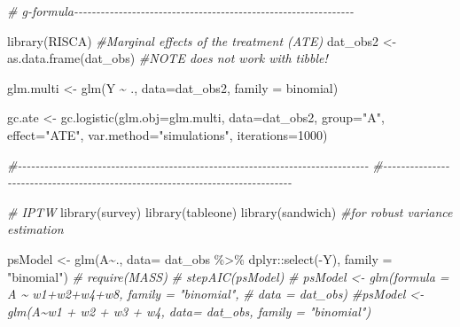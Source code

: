 \documentclass[
]{article}
\newenvironment{Shaded}{\begin{snugshade}}{\end{snugshade}}
\newcommand{\AttributeTok}[1]{\textcolor[rgb]{0.77,0.63,0.00}{#1}}
\newcommand{\CommentTok}[1]{\textcolor[rgb]{0.56,0.35,0.01}{\textit{#1}}}
\newcommand{\DecValTok}[1]{\textcolor[rgb]{0.00,0.00,0.81}{#1}}
\newcommand{\FunctionTok}[1]{\textcolor[rgb]{0.00,0.00,0.00}{#1}}
\newcommand{\NormalTok}[1]{#1}
\newcommand{\OtherTok}[1]{\textcolor[rgb]{0.56,0.35,0.01}{#1}}
\newcommand{\SpecialCharTok}[1]{\textcolor[rgb]{0.00,0.00,0.00}{#1}}
\newcommand{\StringTok}[1]{\textcolor[rgb]{0.31,0.60,0.02}{#1}}
\begin{document}
\begin{Shaded}
\begin{Highlighting}[]
\CommentTok{\# g{-}formula{-}{-}{-}{-}{-}{-}{-}{-}{-}{-}{-}{-}{-}{-}{-}{-}{-}{-}{-}{-}{-}{-}{-}{-}{-}{-}{-}{-}{-}{-}{-}{-}{-}{-}{-}{-}{-}{-}{-}{-}{-}{-}{-}{-}{-}{-}{-}{-}{-}{-}{-}{-}{-}{-}{-}{-}{-}{-}{-}{-}{-}{-}{-}}


\FunctionTok{library}\NormalTok{(RISCA)}
\CommentTok{\#Marginal effects of the treatment (ATE)}
\NormalTok{dat\_obs2 }\OtherTok{\textless{}{-}} \FunctionTok{as.data.frame}\NormalTok{(dat\_obs) }\CommentTok{\#NOTE does not work with tibble!}

\NormalTok{glm.multi }\OtherTok{\textless{}{-}} \FunctionTok{glm}\NormalTok{(Y }\SpecialCharTok{\textasciitilde{}}\NormalTok{ ., }\AttributeTok{data=}\NormalTok{dat\_obs2, }\AttributeTok{family =}\NormalTok{ binomial)}

\NormalTok{gc.ate }\OtherTok{\textless{}{-}} \FunctionTok{gc.logistic}\NormalTok{(}\AttributeTok{glm.obj=}\NormalTok{glm.multi, }\AttributeTok{data=}\NormalTok{dat\_obs2, }\AttributeTok{group=}\StringTok{"A"}\NormalTok{, }\AttributeTok{effect=}\StringTok{"ATE"}\NormalTok{,}
                      \AttributeTok{var.method=}\StringTok{"simulations"}\NormalTok{, }\AttributeTok{iterations=}\DecValTok{1000}\NormalTok{)}

\CommentTok{\#{-}{-}{-}{-}{-}{-}{-}{-}{-}{-}{-}{-}{-}{-}{-}{-}{-}{-}{-}{-}{-}{-}{-}{-}{-}{-}{-}{-}{-}{-}{-}{-}{-}{-}{-}{-}{-}{-}{-}{-}{-}{-}{-}{-}{-}{-}{-}{-}{-}{-}{-}{-}{-}{-}{-}{-}{-}{-}{-}{-}{-}{-}{-}{-}{-}{-}{-}{-}{-}{-}{-}{-}{-}{-}{-}{-}{-}{-}{-}}
\CommentTok{\#{-}{-}{-}{-}{-}{-}{-}{-}{-}{-}{-}{-}{-}{-}{-}{-}{-}{-}{-}{-}{-}{-}{-}{-}{-}{-}{-}{-}{-}{-}{-}{-}{-}{-}{-}{-}{-}{-}{-}{-}{-}{-}{-}{-}{-}{-}{-}{-}{-}{-}{-}{-}{-}{-}{-}{-}{-}{-}{-}{-}{-}{-}{-}{-}{-}{-}{-}{-}{-}{-}{-}{-}{-}{-}{-}{-}{-}{-}{-}}

\CommentTok{\# IPTW}
\FunctionTok{library}\NormalTok{(survey)}
\FunctionTok{library}\NormalTok{(tableone)}
\FunctionTok{library}\NormalTok{(sandwich) }\CommentTok{\#for robust variance estimation}

\NormalTok{psModel }\OtherTok{\textless{}{-}} \FunctionTok{glm}\NormalTok{(A}\SpecialCharTok{\textasciitilde{}}\NormalTok{., }\AttributeTok{data=}\NormalTok{ dat\_obs }\SpecialCharTok{\%\textgreater{}\%}\NormalTok{ dplyr}\SpecialCharTok{::}\FunctionTok{select}\NormalTok{(}\SpecialCharTok{{-}}\NormalTok{Y), }\AttributeTok{family =} \StringTok{"binomial"}\NormalTok{)}
\CommentTok{\# require(MASS)}
\CommentTok{\# stepAIC(psModel)}
\CommentTok{\# psModel \textless{}{-} glm(formula = A \textasciitilde{}  w1+w2+w4+w8, family = "binomial", }
\CommentTok{\#                data = dat\_obs)}
\CommentTok{\#psModel \textless{}{-} glm(A\textasciitilde{}w1 + w2 + w3 + w4, data= dat\_obs, family = "binomial")}


\end{Highlighting}
\end{Shaded}
\end{document}
